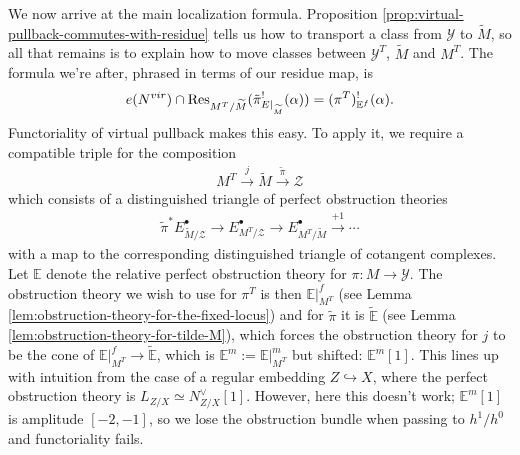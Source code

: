 We now arrive at the main localization formula. Proposition \ref{prop:virtual-pullback-commutes-with-residue} tells us how to transport a class from \(\mathcal Y\) to \(\widetilde M\), so all that remains is to explain how to move classes between \(\mathcal Y^T\), \(\widetilde M\) and \(M^T\). The formula we're after, phrased in terms of our residue map, is
\begin{align*}
  e(N^{vir})\cap \operatorname{Res}_{M^T/\widetilde{M}}(\tilde{\pi}_{E|_{\widetilde{M}}}^!(\alpha)) = (\pi^T)^!_{\mathbb{E}^f}(\alpha).
\end{align*}
Functoriality of virtual pullback \cite[Theorem 4.8]{manolache_VirtualPullbacks2012} makes this easy. To apply it, we require a compatible triple \cite[Definition 4.5]{manolache_VirtualPullbacks2012} for the composition
\begin{align*}
  M^T \xrightarrow{j} \widetilde M \xrightarrow{\widetilde \pi} \mathcal Z
\end{align*}
which consists of a distinguished triangle of perfect obstruction theories
\begin{align*}
  \widetilde \pi^* E^\bullet_{\widetilde M/\mathcal Z} \to E^\bullet_{M^T/\mathcal Z} \to E^\bullet_{M^T/\widetilde M} \xrightarrow{+1} \cdots
\end{align*}
with a map to the corresponding distinguished triangle of cotangent complexes. Let \(\mathbb E\) denote the relative perfect obstruction theory for \(\pi:M\to \mathcal Y\). The obstruction theory we wish to use for \(\pi^T\) is then \(\mathbb E|_{M^T}^f\) (see Lemma \ref{lem:obstruction-theory-for-the-fixed-locus}) and for \(\widetilde \pi\) it is \(\widetilde {\mathbb E}\) (see Lemma \ref{lem:obstruction-theory-for-tilde-M}), which forces the obstruction theory for \(j\) to be the cone of \(\mathbb E|_{M^T}^f\to \widetilde{\mathbb E}\), which is \(\mathbb E^m := \mathbb E|_{M^T}^m\) but shifted: \(\mathbb E^m[1]\). This lines up with intuition from the case of a regular embedding \(Z\hookrightarrow X\), where the perfect obstruction theory is \(L_{Z/X} \simeq N^\vee_{Z/X}[1]\). However, here this doesn't work; \(\mathbb E^m[1]\) is amplitude \([-2,-1]\), so we lose the obstruction bundle when passing to \(h^1/h^0\) and functoriality fails.

